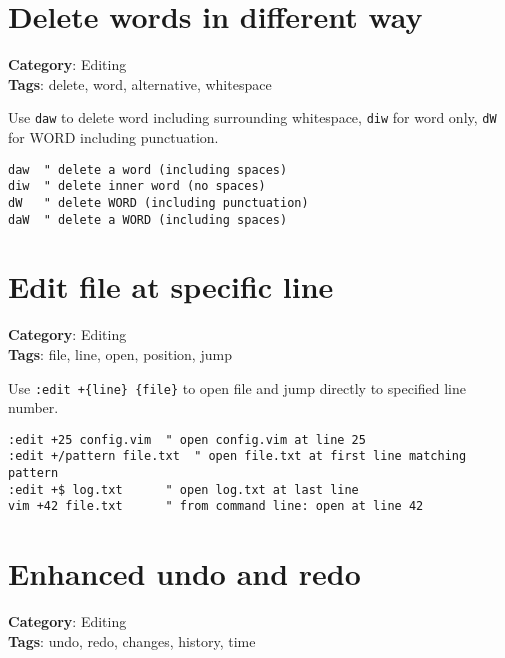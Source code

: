 {{{{\section{Delete words in different way}

\textbf{Category}: Editing\\ \textbf{Tags}: delete, word, alternative, whitespace
\vspace{0.5cm}

Use {\footnotesize \Verb§daw§} to delete word including surrounding whitespace, {\footnotesize \Verb§diw§} for word only, {\footnotesize \Verb§dW§} for WORD including punctuation.

\begin{Exa*}{}
\begin{Verbatim}[fontsize=\footnotesize, breaklines, breakanywhere]
daw  " delete a word (including spaces)
diw  " delete inner word (no spaces)
dW   " delete WORD (including punctuation)
daW  " delete a WORD (including spaces)
\end{Verbatim}
\end{Exa*}

\section{Edit file at specific line}

\textbf{Category}: Editing\\ \textbf{Tags}: file, line, open, position, jump
\vspace{0.5cm}

Use {\footnotesize \Verb§:edit +{line} {file}§} to open file and jump directly to specified line number.

\begin{Exa*}{}
\begin{Verbatim}[fontsize=\footnotesize, breaklines, breakanywhere]
:edit +25 config.vim  " open config.vim at line 25
:edit +/pattern file.txt  " open file.txt at first line matching pattern
:edit +$ log.txt      " open log.txt at last line
vim +42 file.txt      " from command line: open at line 42
\end{Verbatim}
\end{Exa*}

\section{Enhanced undo and redo}

\textbf{Category}: Editing\\ \textbf{Tags}: undo, redo, changes, history, time
\vspace{0.5cm}

}}}}
